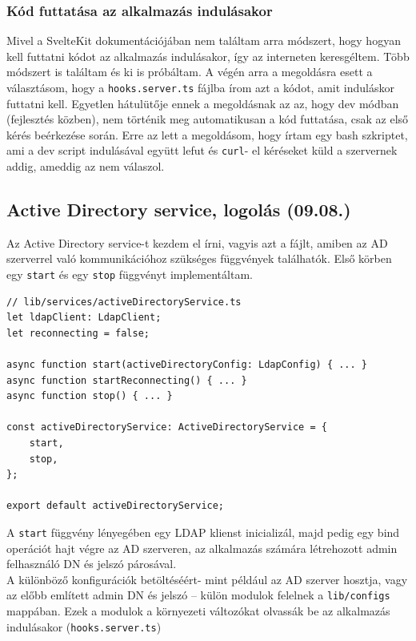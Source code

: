 \documentclass[a4paper]{article}
\newcommand{\inlts}[1]{\texttt{#1}}
\newcommand{\inltxt}[1]{\texttt{#1}}
\begin{document}
\subsubsection*{Kód futtatása az alkalmazás indulásakor}
Mivel a SvelteKit dokumentációjában nem találtam arra módszert, hogy hogyan kell futtatni kódot az
alkalmazás indulásakor, így az interneten keresgéltem. Több módszert is találtam és ki is próbáltam. A
végén arra a megoldásra esett a választásom, hogy a \inlts{hooks.server.ts} fájlba írom azt a kódot, amit
induláskor futtatni kell. Egyetlen hátulütője ennek a megoldásnak az az, hogy dev módban (fejlesztés
közben), nem történik meg automatikusan a kód futtatása, csak az első kérés beérkezése során. Erre
az lett a megoldásom, hogy írtam egy bash szkriptet, ami a dev script indulásával együtt lefut és \inltxt{curl}-
el kéréseket küld a szervernek addig, ameddig az nem válaszol.

\subsection{Active Directory service, logolás (09.08.)}

Az Active Directory service-t kezdem el írni, vagyis azt a fájlt, amiben az AD szerverrel való
kommunikációhoz szükséges függvények találhatók. Első körben egy \inlts{start} és egy \inlts{stop} függvényt
implementáltam.

\FloatBarrier
\begin{verbatim}
// lib/services/activeDirectoryService.ts
let ldapClient: LdapClient;
let reconnecting = false;

async function start(activeDirectoryConfig: LdapConfig) { ... }
async function startReconnecting() { ... }
async function stop() { ... }

const activeDirectoryService: ActiveDirectoryService = {
    start,
    stop,
};

export default activeDirectoryService;
\end{verbatim}

A \inlts{start} függvény lényegében egy LDAP klienst inicializál, majd pedig egy bind operációt hajt végre az
AD szerveren, az alkalmazás számára létrehozott admin felhasználó DN és jelszó párosával.\\

A különböző konfigurációk betöltéséért- mint például az AD szerver hosztja, vagy az előbb említett
admin DN és jelszó – külön modulok felelnek a \inlts{lib/configs} mappában. Ezek a modulok a környezeti
változókat olvassák be az alkalmazás indulásakor (\inlts{hooks.server.ts}) \\
\end{document}
